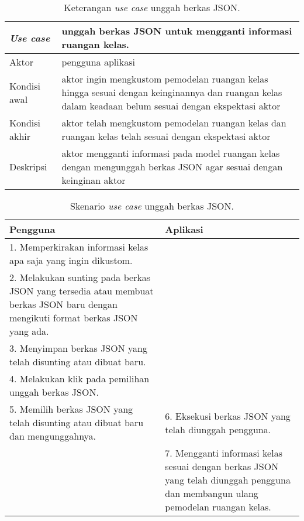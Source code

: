 \begin{table}[H]
	\centering
	\begin{tabular}{| m{10em} | m{30em} |} 
	\hline
	\textbf{\textit{Use case}} & \textbf{unggah berkas JSON untuk mengganti informasi ruangan kelas.} \\ 
	\hline
	Aktor & pengguna aplikasi  \\ 
	\hline
	Kondisi awal & aktor ingin mengkustom pemodelan ruangan kelas hingga sesuai dengan keinginannya dan ruangan kelas dalam keadaan belum sesuai dengan ekspektasi aktor  \\ 
	\hline
	Kondisi akhir & aktor telah mengkustom pemodelan ruangan kelas dan ruangan kelas telah sesuai dengan ekspektasi aktor \\ 
 	\hline
	Deskripsi & aktor mengganti informasi pada model ruangan kelas dengan mengunggah berkas JSON agar sesuai dengan keinginan aktor \\ 
 	\hline
	\end{tabular}
	\caption{Keterangan {\it use case} unggah berkas JSON.}
	\label{table:fiturunggah1}
\end{table}

\begin{table}[H]
	\centering
	\begin{tabular}{| m{20em} | m{20em} |} 
	\hline
	\textbf{Pengguna} & \textbf{Aplikasi} \\ 
	\hline
	1. Memperkirakan informasi kelas apa saja yang ingin dikustom. &  \\ 
	\hline
	2. Melakukan sunting pada berkas JSON yang tersedia atau membuat berkas JSON baru dengan mengikuti format berkas JSON yang ada. &  \\ 
	\hline
	3. Menyimpan berkas JSON yang telah disunting atau dibuat baru. &  \\ 
	\hline
	4. Melakukan klik pada pemilihan unggah berkas JSON. &  \\ 
	\hline
	5. Memilih berkas JSON yang telah disunting atau dibuat baru dan mengunggahnya. & 6. Eksekusi berkas JSON yang telah diunggah pengguna. \\ 
	\hline
	 & 7. Mengganti informasi kelas sesuai dengan berkas JSON yang telah diunggah pengguna dan membangun ulang pemodelan ruangan kelas. \\ 
 	\hline
	\end{tabular}
	\caption{Skenario {\it use case} unggah berkas JSON.}
	\label{table:fiturunggah2}
\end{table}

